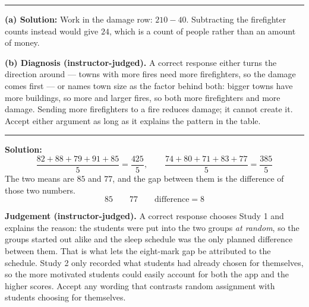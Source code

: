 \documentclass[12pt]{article}
\begin{document}
\vspace{0.2cm}

\noindent\rule{\linewidth}{0.2pt}


\textbf{(a) Solution:} \quad Work in the damage row: $210 - 40$. Subtracting the firefighter
counts instead would give $24$, which is a count of people rather than an amount of money.

\textbf{(b) Diagnosis (instructor-judged).} A correct response either turns the direction around
--- towns with more fires need more firefighters, so the damage comes first --- or names town size
as the factor behind both: bigger towns have more buildings, so more and larger fires, so both
more firefighters and more damage. Sending more firefighters to a fire reduces damage; it cannot
create it. Accept either argument as long as it explains the pattern in the table.

\vspace{0.2cm}

\noindent\rule{\linewidth}{0.2pt}


\textbf{Solution:} \quad
\[ \frac{82 + 88 + 79 + 91 + 85}{5} = \frac{425}{5}, \qquad
   \frac{74 + 80 + 71 + 83 + 77}{5} = \frac{385}{5} \]
The two means are $85$ and $77$, and the gap between them is the difference of those two numbers.
\[ \boxed{85 \qquad 77 \qquad \text{difference} = 8} \]

\textbf{Judgement (instructor-judged).} A correct response chooses Study 1 and explains the
reason: the students were put into the two groups \textit{at random}, so the groups started out
alike and the sleep schedule was the only planned difference between them. That is what lets the
eight-mark gap be attributed to the schedule. Study 2 only recorded what students had already
chosen for themselves, so the more motivated students could easily account for both the app and
the higher scores. Accept any wording that contrasts random assignment with students choosing for
themselves.
\end{document}
